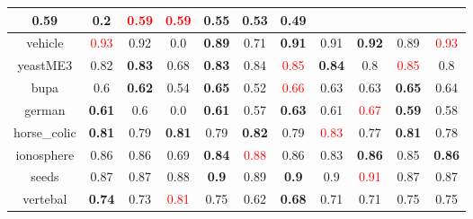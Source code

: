 \documentclass{article}%
\begin{document}
\begin{tabular}{c|cccccccccc}
{0.59
}&0.2&\textcolor{red}{ 
0.59
}&\textcolor{red}{ 
0.59
}&0.55&\textbf{0.53}&0.49\\%
\hline%
vehicle&\textcolor{red}{ 
0.93
}&0.92&0.0&\textbf{0.89}&0.71&\textbf{0.91}&0.91&\textbf{0.92}&0.89&\textcolor{red}{ 
0.93
}\\%
\hline%
yeastME3&0.82&\textbf{0.83}&0.68&\textbf{0.83}&0.84&\textcolor{red}{ 
0.85
}&\textbf{0.84}&0.8&\textcolor{red}{ 
0.85
}&0.8\\%
\hline%
bupa&0.6&\textbf{0.62}&0.54&\textbf{0.65}&0.52&\textcolor{red}{ 
0.66
}&0.63&0.63&\textbf{0.65}&0.64\\%
\hline%
german&\textbf{0.61}&0.6&0.0&\textbf{0.61}&0.57&\textbf{0.63}&0.61&\textcolor{red}{ 
0.67
}&\textbf{0.59}&0.58\\%
\hline%
horse\_colic&\textbf{0.81}&0.79&\textbf{0.81}&0.79&\textbf{0.82}&0.79&\textcolor{red}{ 
0.83
}&0.77&\textbf{0.81}&0.78\\%
\hline%
ionosphere&0.86&0.86&0.69&\textbf{0.84}&\textcolor{red}{ 
0.88
}&0.86&0.83&\textbf{0.86}&0.85&\textbf{0.86}\\%
\hline%
seeds&0.87&0.87&0.88&\textbf{0.9}&0.89&\textbf{0.9}&0.9&\textcolor{red}{ 
0.91
}&0.87&0.87\\%
\hline%
vertebal&\textbf{0.74}&0.73&\textcolor{red}{ 
0.81
}&0.75&0.62&\textbf{0.68}&0.71&0.71&0.75&0.75\\%
\hline%
\end{tabular}

%
\end{document}
